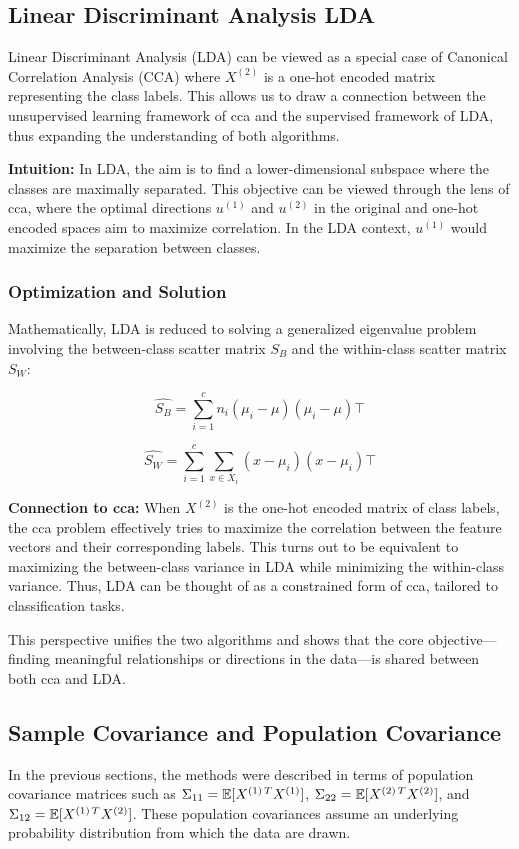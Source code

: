 \subsection{Linear Discriminant Analysis LDA}

Linear Discriminant Analysis (LDA) can be viewed as a special case of Canonical Correlation Analysis (CCA) where \(X^{(2)}\) is a one-hot encoded matrix representing the class labels.
This allows us to draw a connection between the unsupervised learning framework of \acrshort{cca} and the supervised framework of LDA, thus expanding the understanding of both algorithms.

\textbf{Intuition:} In LDA, the aim is to find a lower-dimensional subspace where the classes are maximally separated. This objective can be viewed through the lens of \acrshort{cca}, where the optimal directions \(u^{(1)}\) and \(u^{(2)}\) in the original and one-hot encoded spaces aim to maximize correlation. In the LDA context, \(u^{(1)}\) would maximize the separation between classes.

\subsubsection{Optimization and Solution}

Mathematically, LDA is reduced to solving a generalized eigenvalue problem involving the between-class scatter matrix \(S_B\) and the within-class scatter matrix \(S_W\):

\[
    \hat{S_B} = \sum_{i=1}^{c} n_i (\mu_i - \mu)(\mu_i - \mu)\top
\]

\[
    \hat{S_W} = \sum_{i=1}^{c} \sum_{x \in X_i} (x - \mu_i)(x - \mu_i)\top
\]

\textbf{Connection to \acrshort{cca}:} When \(X^{(2)}\) is the one-hot encoded matrix of class labels, the \acrshort{cca} problem effectively tries to maximize the correlation between the feature vectors and their corresponding labels.
This turns out to be equivalent to maximizing the between-class variance in LDA while minimizing the within-class variance.
Thus, LDA can be thought of as a constrained form of \acrshort{cca}, tailored to classification tasks.

This perspective unifies the two algorithms and shows that the core objective—finding meaningful relationships or directions in the data—is shared between both \acrshort{cca} and LDA.

\subsection{Sample Covariance and Population Covariance}
In the previous sections, the methods were described in terms of population covariance matrices such as \(\Sigma_{11}=\mathbb{E}[X^{(1)\,T} X^{(1)}]\), \(\Sigma_{22}=\mathbb{E}[X^{(2)\,T} X^{(2)}]\), and \(\Sigma_{12}=\mathbb{E}[X^{(1)\,T} X^{(2)}]\). These population covariances assume an underlying probability distribution from which the data are drawn.


